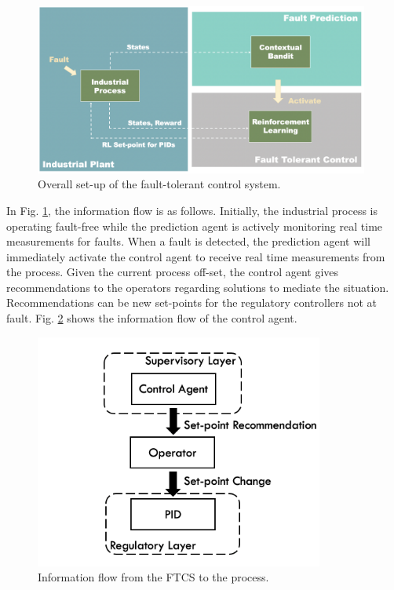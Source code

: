 \begin{figure}[h]
    \begin{center}
        \includegraphics[width=11cm]{images/ftc/FTC_Setup.png}
        \caption{\label{fig:ftc_setup} Overall set-up of the fault-tolerant control system.}
    \end{center}
\end{figure}
In Fig. \ref{fig:ftc_setup}, the information flow is as follows.  Initially, the industrial process is operating fault-free while the prediction agent is actively monitoring real time measurements for faults.  When a fault is detected, the prediction agent will immediately activate the control agent to receive real time measurements from the process.  Given the current process off-set, the control agent gives recommendations to the operators regarding solutions to mediate the situation.  Recommendations can be new set-points for the regulatory controllers not at fault.
Fig. \ref{fig:ftc_pid_setup} shows the information flow of the control agent. 
\begin{figure}[h]
    \begin{center}
        \includegraphics[width=9.5cm]{images/ftc/ftc_pid_setup.png}
        \caption{\label{fig:ftc_pid_setup} Information flow from the FTCS to the process.}
    \end{center}
\end{figure}

